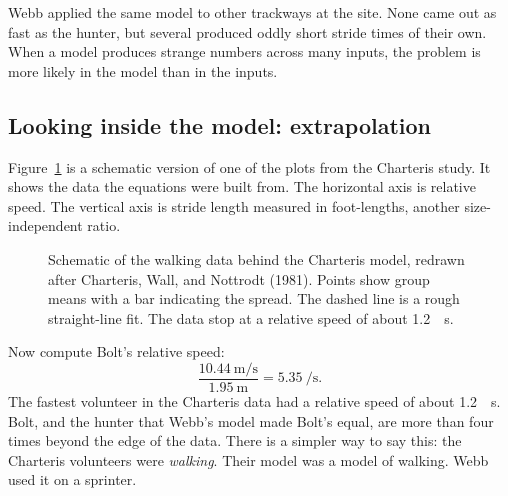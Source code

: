 \documentclass[11pt,twoside,openany]{book}
\begin{document}
Webb applied the same model to other trackways at the site. None came out as fast as the hunter, but several produced oddly short stride times of their own. When a model produces strange numbers across many inputs, the problem is more likely in the model than in the inputs.

\subsection{Looking inside the model: extrapolation}

Figure~\ref{fig:charteris} is a schematic version of one of the plots from the Charteris study. It shows the data the equations were built from. The horizontal axis is relative speed. The vertical axis is stride length measured in foot-lengths, another size-independent ratio.

\begin{figure}[htb]
\centering
{}
\caption{Schematic of the walking data behind the Charteris model, redrawn after Charteris, Wall, and Nottrodt (1981). Points show group means with a bar indicating the spread. The dashed line is a rough straight-line fit. The data stop at a relative speed of about \SI{1.2}{\per\second}.}
\label{fig:charteris}
\end{figure}

Now compute Bolt's relative speed:
\[
\frac{\SI{10.44}{\metre\per\second}}{\SI{1.95}{\metre}} = \SI{5.35}{\per\second}.
\]
The fastest volunteer in the Charteris data had a relative speed of about \SI{1.2}{\per\second}. Bolt, and the hunter that Webb's model made Bolt's equal, are more than four times beyond the edge of the data. There is a simpler way to say this: the Charteris volunteers were \emph{walking}. Their model was a model of walking. Webb used it on a sprinter.
\end{document}
